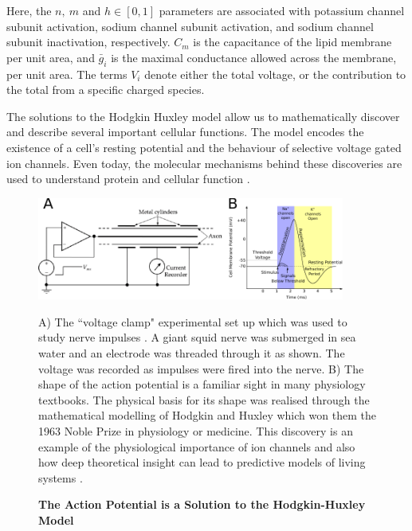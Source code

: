 Here, the $n,\ m$ and $h \in [0,1]$ parameters are associated with potassium channel subunit activation, sodium channel subunit activation, and sodium channel subunit inactivation, respectively. $C_m$ is the capacitance of the lipid membrane per unit area, and $\bar{g}_i$ is the maximal conductance allowed across the membrane, per unit area. The terms $V_i$ denote either the total voltage, or the contribution to the total from a specific charged species.

The solutions to the Hodgkin Huxley model allow us to mathematically discover and describe several important cellular functions. The model encodes the existence of a cell's resting potential and the behaviour of selective voltage gated ion channels. Even today, the molecular mechanisms behind these discoveries are used to understand protein and cellular function \cite{aidley1996}. 

\begin{figure}
	\begin{center}
		\includegraphics[width=0.9\textwidth]{figures/Hodgkin-Huxley_action_potential.pdf}
	\end{center}
	\captionsetup{singlelinecheck = false, justification=raggedright}
	\caption[The Action Potential is a Solution to the Hodkin-Huxley Model] {\textbf{The Action Potential is a Solution to the Hodgkin-Huxley Model }}{ A) The ``voltage clamp" experimental set up which was used to study nerve impulses \cite{hodgkin_huxley_figure_website}. A giant squid nerve was submerged in sea water and an electrode was threaded through it as shown. The voltage was recorded as impulses were fired into the nerve. B) The shape of the action potential is a familiar sight in many physiology textbooks. The physical basis for its shape was realised through the mathematical modelling of Hodgkin and Huxley which won them the 1963 Noble Prize in physiology or medicine. This discovery is an example of the physiological importance of ion channels and also how deep theoretical insight can lead to predictive models of living systems \cite{hodgkin1952, hodgkin1952a, hodgkin1952b, hodgkin1952c, hodgkin1952d}.}
	\label{action_potential_graphic}
\end{figure}


